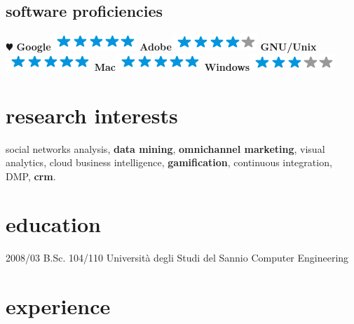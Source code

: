 \documentclass[]{gabrielebaldassarre-cv}
\begin{document}
\begin{aside}
 \section{software proficiencies}
    {\color{red} $\varheartsuit$} \textbf{Google}\includegraphics[scale=0.40]{img/5stars.png}
    \textbf{Adobe}\includegraphics[scale=0.40]{img/4stars.png}
    \textbf{GNU/Unix}\includegraphics[scale=0.40]{img/5stars.png}
    \textbf{Mac}\includegraphics[scale=0.40]{img/5stars.png}
    \textbf{Windows}\includegraphics[scale=0.40]{img/3stars.png}
\end{aside}

\section{research interests}

social networks analysis, \textbf{data mining}, \textbf{omnichannel marketing}, visual analytics, cloud
business intelligence, \textbf{gamification}, continuous integration, DMP, \textbf{crm}.

\section{education}

\begin{entrylist}
  \entry
    {2008/03}
    {B.Sc. 104/110}
    {Università degli Studi del Sannio}
    {Computer Engineering}
 \end{entrylist}

\section{experience}
\end{document}

